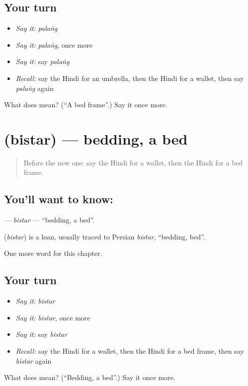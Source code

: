 \subsection*{Your turn}
\begin{itemize}
\raggedright
  \item \emph{Say it:} \emph{palaṅg}
  \item \emph{Say it:} \emph{palaṅg}, once more
  \item \emph{Say it:} say \emph{palaṅg}
  \item \emph{Recall:} say the Hindi for an umbrella, then the Hindi for a wallet, then say \emph{palaṅg} again
\end{itemize}

\begin{tcolorbox}[breakable,colback=teal!4,colframe=teal!35!black,title={Before you move on}]
What does  mean? (\textquotedblleft{}A bed frame\textquotedblright{}.) Say it once more.
\end{tcolorbox}
\section[\texorpdfstring{\hi{बिस्तर} (bistar)}{बिस्तर (bistar)}]{ (bistar) — bedding, a bed}

\label{lesson:HI-C133-bistar}



\begin{quote}
Before the new one: say the Hindi for a wallet, then the Hindi for a bed frame.
\end{quote}

\subsection*{You'll want to know: }
\textbf{} — \emph{bistar} — \textquotedblleft{}bedding, a bed\textquotedblright{}.

\begin{cousinweb}
\textbf{} (\emph{bistar}) is a loan, usually traced to Persian \emph{bistar}, \textquotedblleft{}bedding, bed\textquotedblright{}.
\end{cousinweb}

\begin{grammarlens}[title={What you've built}]
One more word for this chapter.
\end{grammarlens}

\subsection*{Your turn}
\begin{itemize}
\raggedright
  \item \emph{Say it:} \emph{bistar}
  \item \emph{Say it:} \emph{bistar}, once more
  \item \emph{Say it:} say \emph{bistar}
  \item \emph{Recall:} say the Hindi for a wallet, then the Hindi for a bed frame, then say \emph{bistar} again
\end{itemize}

\begin{tcolorbox}[breakable,colback=teal!4,colframe=teal!35!black,title={Before you move on}]
What does  mean? (\textquotedblleft{}Bedding, a bed\textquotedblright{}.) Say it once more.
\end{tcolorbox}
